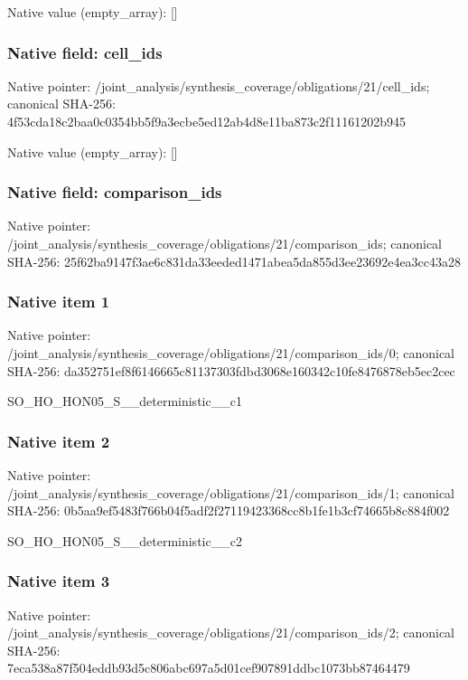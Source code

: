 \documentclass[10pt,a4paper]{article}
\begin{document}
Native value (empty\_\allowbreak{}array): []

\subsubsection{Native field: cell\_\allowbreak{}ids}
Native pointer: /joint\_\allowbreak{}analysis/synthesis\_\allowbreak{}coverage/obligations/21/cell\_\allowbreak{}ids; canonical SHA-256: 4f53cda18c2baa0c0354bb5f9a3ecbe5ed12ab4d8e11ba873c2f11161202b945

Native value (empty\_\allowbreak{}array): []

\subsubsection{Native field: comparison\_\allowbreak{}ids}
Native pointer: /joint\_\allowbreak{}analysis/synthesis\_\allowbreak{}coverage/obligations/21/comparison\_\allowbreak{}ids; canonical SHA-256: 25f62ba9147f3ae6c831da33eeded1471abea5da855d3ee23692e4ea3cc43a28

\subsubsection{Native item 1}
Native pointer: /joint\_\allowbreak{}analysis/synthesis\_\allowbreak{}coverage/obligations/21/comparison\_\allowbreak{}ids/0; canonical SHA-256: da352751ef8f6146665c81137303fdbd3068e160342c10fe8476878eb5ec2cec

\begingroup\raggedright\sloppy SO\_\allowbreak{}HO\_\allowbreak{}HON05\_\allowbreak{}S\_\allowbreak{}\_\allowbreak{}deterministic\_\allowbreak{}\_\allowbreak{}c1\par\endgroup

\subsubsection{Native item 2}
Native pointer: /joint\_\allowbreak{}analysis/synthesis\_\allowbreak{}coverage/obligations/21/comparison\_\allowbreak{}ids/1; canonical SHA-256: 0b5aa9ef5483f766b04f5adf2f27119423368cc8b1fe1b3cf74665b8c884f002

\begingroup\raggedright\sloppy SO\_\allowbreak{}HO\_\allowbreak{}HON05\_\allowbreak{}S\_\allowbreak{}\_\allowbreak{}deterministic\_\allowbreak{}\_\allowbreak{}c2\par\endgroup

\subsubsection{Native item 3}
Native pointer: /joint\_\allowbreak{}analysis/synthesis\_\allowbreak{}coverage/obligations/21/comparison\_\allowbreak{}ids/2; canonical SHA-256: 7eca538a87f504eddb93d5c806abc697a5d01cef907891ddbc1073bb87464479
\end{document}
